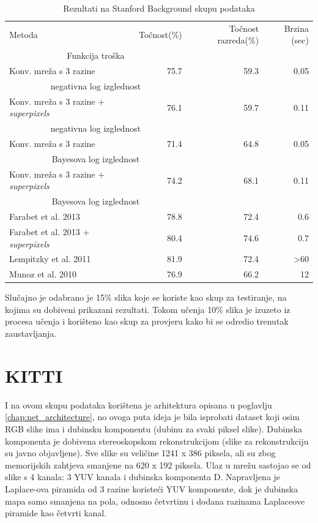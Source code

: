 \documentclass[times, utf8, diplomski, numeric]{fer}
\begin{document}
\begin{table}
\centering
\begin{tabular}{l r r r}
  Metoda & Točnost(\%) & Točnost razreda(\%) & Brzina (sec) \\
    \multicolumn{2}{c}{Funkcija troška} & & \\[0.6em] \hline

  Konv. mreža s 3 razine & 75.7 & 59.3 & 0.05 \\
    \multicolumn{2}{c}{negativna log izglednost} & & \\ \hline
  Konv. mreža s 3 razine + \textit{superpixels} & 76.1 & 59.7 & 0.11 \\
    \multicolumn{2}{c}{negativna log izglednost} & & \\ \hline
  Konv. mreža s 3 razine & 71.4 & 64.8 & 0.05 \\
    \multicolumn{2}{c}{Bayesova log izglednost} & & \\ \hline
  Konv. mreža s 3 razine + \textit{superpixels} & 74.2 & 68.1 & 0.11 \\
    \multicolumn{2}{c}{Bayesova log izglednost} & & \\ \hline \hline
  Farabet et al.\cite{farabet_pami} 2013 & 78.8 & 72.4 & 0.6 \\ \hline
  Farabet et al.\cite{farabet_pami} 2013 + \textit{superpixels} & 80.4 & 74.6 & 0.7 \\ \hline
  Lempitzky et al.\cite{lempitsky11} 2011 & 81.9 & 72.4 & >60 \\ \hline
  Munoz et al.\cite{munoz10} 2010 & 76.9 & 66.2 & 12
\end{tabular}
\caption{Rezultati na Stanford Background skupu podataka}
\end{table}

Slučajno je odabrano je 15\% slika koje se koriste kao skup za testiranje, na kojima su dobiveni prikazani rezultati. Tokom učenja 10\% slika je izuzeto iz procesa učenja i korišteno kao skup za provjeru  kako bi se odredio trenutak zaustavljanja.

\section{KITTI}

I na ovom skupu podataka korištena je arhitektura opisana u poglavlju \ref{chap:net_architecture}, no ovoga puta ideja je bila isprobati dataset koji osim RGB slike ima i dubinsku komponentu (dubinu za svaki piksel slike). Dubinska komponenta je dobivena stereoskopskom rekonstrukcijom (slike za rekonstrukciju su javno objavljene). Sve slike su veličine 1241 x 386 piksela, ali su zbog memorijskih zahtjeva smanjene na 620 x 192 piksela. Ulaz u mrežu sastojao se od slike s 4 kanala: 3 YUV kanala i dubinska komponenta D. Napravljena je Laplace-ova piramida od 3 razine koristeći YUV komponente, dok je dubinska mapa samo smanjena na pola, odnosno četvrtinu i dodana razinama Laplaceove piramide kao četvrti kanal.
\end{document}
